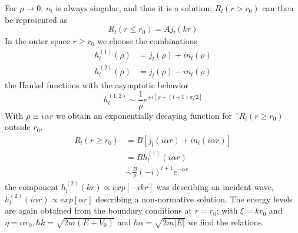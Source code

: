 For $\rho\rightarrow 0$, $n_l$ is always singular, and thus it is a solution; $R_l(r>r_0)$ can then be represented as
\begin{equation}
    R_{l}\left(r \leq r_{0}\right)=A j_{l}(k r)
    \end{equation}
In the outer space $r \geq r_0$ we choose the combinations
\begin{equation}
\begin{aligned} h_{l}^{(1)}(\rho) &=j_{l}(\rho)+i n_{l}(\rho) \\ h_{l}^{(2)}(\rho) &=j_{l}(\rho)-i n_{l}(\rho) \end{aligned}
\end{equation}
the Hankel functions with the asymptotic behavior
\begin{equation}
    h_{l}^{(1,2)} \sim \frac{1}{\rho} e^{\pm i[\rho-(l+1) \pi / 2]}
    \end{equation}
With $\rho\equiv i\alpha r$ we obtain an exponentially decaying function for ¨$R_l (r \geq r_0)$ outside $r_0$,
\begin{equation}
\begin{aligned} R_{l}\left(r \geq r_{0}\right) &=B\left[j_{l}(i \alpha r)+i n_{l}(i \alpha r)\right] \\ &=B h_{l}^{(1)}(i \alpha r) \\ & \sim \frac{B}{\rho}(-i)^{l+1} e^{-\alpha r} \end{aligned}
\end{equation}
the component $h_l^{(2)}(kr)\propto exp[-ikr]$ was describing an incident wave, $h_l^{(2)}(i\alpha r)\propto exp[\alpha r]$ describing a non-normative solution. The energy levels are again obtained from the boundary conditions at $r = r_0$: with $\xi = kr_0$ and $\eta =\alpha r_0,\hbar k=\sqrt{2m(E+V_0)}$ and $\hbar \alpha = \sqrt{2m|E|}$ we find the relations

